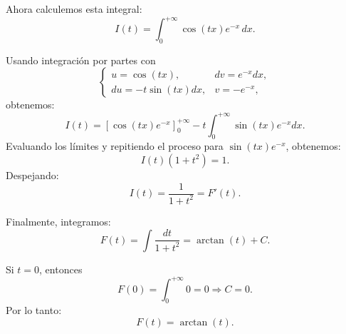{Ahora calculemos esta integral:
\[ I(t) = \int_{0}^{+\infty} \cos(tx) e^{-x} \,dx. \]

Usando integración por partes con
\[
    \begin{cases}
        u = \cos(tx),      & dv = e^{-x}dx, \\
        du = -t\sin(tx)dx, & v = -e^{-x},
    \end{cases}
\]
obtenemos:
\[ I(t) = [\cos(tx) e^{-x}]_{0}^{+\infty} - t \int_{0}^{+\infty} \sin(tx) e^{-x}dx. \]
Evaluando los límites y repitiendo el proceso para \( \sin(tx) e^{-x} \),
obtenemos:
\[ I(t) (1+t^2) = 1. \]
Despejando:
\[ I(t) = \frac{1}{1+t^2} = F'(t). \]

Finalmente, integramos:
\[ F(t) = \int \frac{dt}{1+t^2} = \arctan(t) + C. \]

Si \( t = 0 \), entonces
\[ F(0) = \int_{0}^{+\infty} 0 = 0 \Rightarrow C = 0. \]
Por lo tanto:
\[ F(t) = \arctan(t). \]
}

